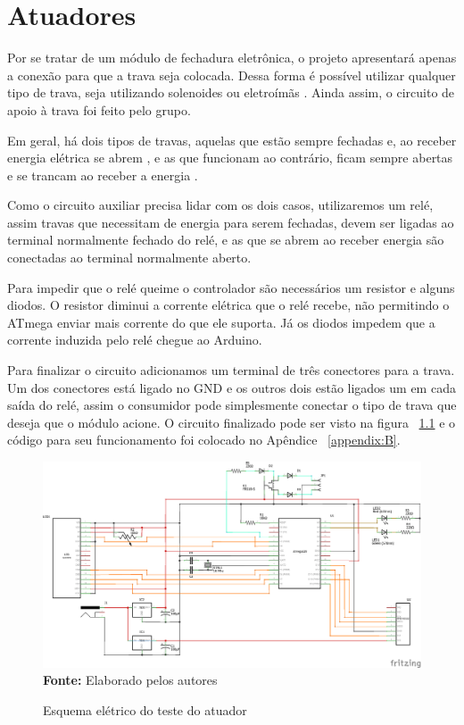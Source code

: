 \chapter{Atuadores}
Por se tratar de um módulo de fechadura eletrônica, o projeto
apresentará apenas a conexão para que a trava seja colocada.
Dessa forma é possível utilizar qualquer tipo de trava, seja
utilizando solenoides ou eletroímãs \cite{intelbras2019}. Ainda
assim, o circuito de apoio à trava foi feito pelo grupo.

Em geral, há dois tipos de travas, aquelas que estão sempre
fechadas e, ao receber energia elétrica se abrem \cite{madeira2018},
e as que funcionam ao contrário, ficam sempre abertas e se
trancam ao receber a energia \cite{desterro2018}.

Como o circuito auxiliar precisa lidar com os dois casos,
utilizaremos um relé, assim travas que necessitam de energia
para serem fechadas, devem ser ligadas ao terminal normalmente
fechado do relé, e as que se abrem ao receber energia são conectadas
ao terminal normalmente aberto.

Para impedir que o relé queime o controlador são necessários
um resistor e alguns diodos. O resistor diminui a corrente
elétrica que o relé recebe, não permitindo o ATmega  enviar
mais corrente do que ele suporta. Já os diodos impedem que a
corrente induzida pelo relé chegue ao Arduino.

Para finalizar o circuito adicionamos um terminal de três
conectores para a trava. Um dos conectores está ligado no
GND e os outros dois estão ligados um em cada saída do relé,
assim o consumidor pode simplesmente conectar o tipo de trava
que deseja que o módulo acione. O circuito finalizado pode ser
visto na figura ~\ref{fig:esquemaatuador} e o código para seu
funcionamento foi colocado no Apêndice ~\ref{appendix:B}.

\FloatBarrier
\begin{figure}[!htbp]
	\centering
	\caption{Esquema elétrico do teste do atuador}
	\includegraphics[scale=.6]{imagens/esquemaatuador}
	\\\textbf{Fonte:} Elaborado pelos autores
	\label{fig:esquemaatuador}
\end{figure}
\FloatBarrier